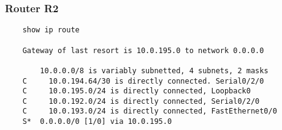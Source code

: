 \documentclass[wide,a4paper,titlepage,12pt] {article}
\begin{document}
  \subsubsection{Router R2}
  \begin{verbatim}
    show ip route

    Gateway of last resort is 10.0.195.0 to network 0.0.0.0

        10.0.0.0/8 is variably subnetted, 4 subnets, 2 masks
    C     10.0.194.64/30 is directly connected. Serial0/2/0
    C     10.0.195.0/24 is directly connected, Loopback0
    C     10.0.192.0/24 is directly connected, Serial0/2/0
    C     10.0.193.0/24 is directly connected, FastEthernet0/0
    S*  0.0.0.0/0 [1/0] via 10.0.195.0
  \end{verbatim}
\end{document}
